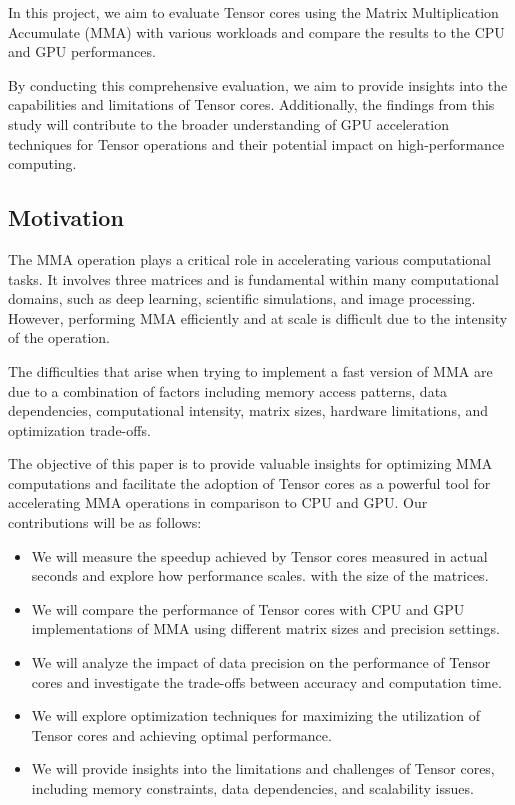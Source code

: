 \documentclass[conference]{IEEEtran}
\begin{document}
In this project, we aim to evaluate Tensor cores using the Matrix Multiplication Accumulate (MMA) with various 
workloads and compare the results to the CPU and GPU performances. 

By conducting this comprehensive evaluation, we aim to provide insights into the capabilities and 
limitations of Tensor cores. Additionally, the findings from this study will contribute to the 
broader understanding of GPU acceleration techniques for Tensor operations and their potential 
impact on high-performance computing.

\subsection{Motivation}\label{sec:Motivation}

The MMA operation plays a critical role in accelerating various computational tasks.
It involves three matrices and is fundamental within many computational domains, 
such as deep learning, scientific simulations, and image processing. However, performing MMA 
efficiently and at scale is difficult due to the intensity of the operation. 

The difficulties that arise when trying to implement a fast version of MMA are due to 
a combination of factors including memory access patterns, data dependencies, 
computational intensity, matrix sizes, hardware limitations, and optimization trade-offs.

The objective of this paper is to provide valuable insights for optimizing MMA computations
and facilitate the adoption of Tensor cores as a powerful tool for accelerating MMA 
operations in comparison to CPU and GPU. Our contributions will be as follows:
\begin{itemize}
  \item We will measure the speedup achieved by Tensor cores measured in actual seconds and explore how 
  performance scales.
  with the size of the matrices.

  \item We will compare the performance of Tensor cores with CPU and GPU implementations of MMA 
  using different matrix sizes and precision settings.
  
  \item We will analyze the impact of data precision on the performance of Tensor cores and 
  investigate the trade-offs between accuracy and computation time.
  
  \item We will explore optimization techniques for maximizing the utilization of Tensor cores 
  and achieving optimal performance.
  
  \item We will provide insights into the limitations and challenges of Tensor cores, 
  including memory constraints, data dependencies, and scalability issues.
  
  \end{itemize}
  
\end{document}
